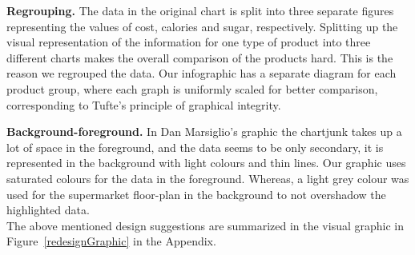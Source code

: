 \textbf{Regrouping.} The data in the original chart is split into three separate
figures representing the values of cost, calories and sugar, respectively.
Splitting up the visual representation of the information for one type of
product into three different charts makes the overall comparison of the products
hard. This is the reason we regrouped the data. Our infographic has a separate
diagram for each product group, where each graph is uniformly scaled for better
comparison, corresponding to Tufte's principle of graphical integrity.

\textbf{Background-foreground.} In Dan Marsiglio's graphic the chartjunk takes
up a lot of space in the foreground, and the data seems to be only secondary, it
is represented in the background with light colours and thin lines. Our graphic
uses saturated colours for the data in the foreground. Whereas, a light grey
colour was used for the supermarket floor-plan in the background to not
overshadow the highlighted data.\\

The above mentioned design suggestions are summarized in the visual graphic in
Figure~\ref{redesignGraphic} in the Appendix.
